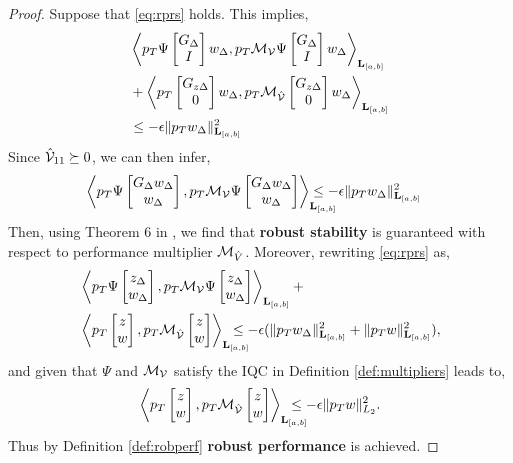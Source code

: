 \begin{proof}
	Suppose that \eqref{eq:rprs} holds. This implies,
\begin{align*}
	 & \left\langle p_T \Psi\begin{bmatrix}G_\Delta \\ I\end{bmatrix}w_\Delta, p_T\mathcal{M}_{\mathcal{V}}\Psi\begin{bmatrix}G_\Delta \\ I\end{bmatrix}w_\Delta \right\rangle_{\mathbf{L}_{[a, b]}} \\ &+ \left\langle p_T \begin{bmatrix}G_{z\Delta} \\ 0\end{bmatrix}w_\Delta, p_T\mathcal{M}_{\mathcal{\hat{V}}}\begin{bmatrix}G_{z\Delta} \\ 0\end{bmatrix}w_\Delta \right\rangle_{\mathbf{L}_{[a, b]}}\\ &\leq -\epsilon \|p_Tw_\Delta\|^2_{\mathbf{L}_{[a, b]}}
\end{align*}
Since $\mathcal{\hat{V}}_{11}\succeq0$, we can then infer,
\begin{align*}
	 & \ip{p_T \Psi\bmat{G_\Delta  w_\Delta\\ w_\Delta}}{p_T\mcl{M}_\mcl{V}\Psi\bmat{G_\Delta w_\Delta \\ w_\Delta}}_{\mbf L_{[a, b]}}\!\!\!\!\!\!\!\!\!\!\!\!\leq -\epsilon \|p_Tw_\Delta\|^2_{\mbf L_{[a, b]}}
\end{align*}
Then, using Theorem 6 in \cite{10156335}, we find that \textbf{robust stability} is guaranteed with respect to performance multiplier $\mathcal{M}_{\hat{V}}$. Moreover, rewriting \eqref{eq:rprs} as,
\begin{align*}
	 & \ip{p_T\Psi\bmat{z_\Delta\\w_\Delta}}{p_T\mcl{M}_{{\mcl{V}}}\Psi\bmat{z_\Delta \\ w_\Delta}}_{\mbf L_{[a, b]}} + \\&\ip{p_T\bmat{z\\w}}{p_T\mcl{M}_{\hat{\mcl{V}}}\bmat{z \\ w}}_{\mbf L_{[a, b]}}
	\!\!\!\!\!\!\!\!\!\leq  -\epsilon (\|p_T{w_\Delta}\|^2_{\mbf L_{[a, b]}}+\|p_T w\|^2_{\mbf L_{[a, b]}}),
\end{align*}
and given that $\Psi$ and $\mathcal{M}_{\mathcal{V}}$ satisfy the IQC in Definition \ref{def:multipliers} leads to,
\begin{align*}
	\ip{p_T\bmat{z\\w}}{p_T\mcl{M}_{\hat{\mcl{V}}}\bmat{z \\ w}}_{\mbf L_{[a, b]}}\!\!\!\!\!\!\!\!\!\leq  -\epsilon \|p_T w\|^2_{L_2}.
\end{align*}
Thus by Definition \ref{def:robperf} \textbf{robust performance} is achieved.
\end{proof}
